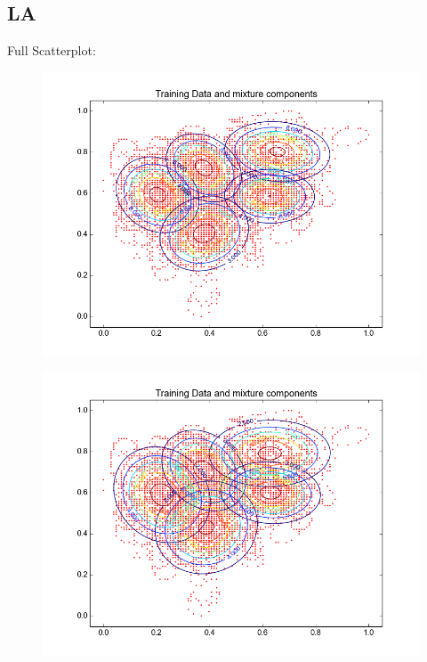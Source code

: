 \documentclass[11pt,a4paper]{article}
\begin{document}
\subsection{LA}
Full Scatterplot: \\
\begin{minipage}[b]{0.25\textwidth}
\begin{figure}[H]
  \centering
  \includegraphics[width=.8\linewidth]{Figures/contours_LA.test0.png}
  \label{fig:sfig1}
\end{figure}%
\end{minipage}
\begin{minipage}[b]{0.25\textwidth}
\begin{figure}[H]
  \centering
  \includegraphics[width=.8\linewidth]{Figures/contours_LA.test5.png}

  \label{fig:sfig1}
\end{figure}%
\end{minipage}
\end{document}
